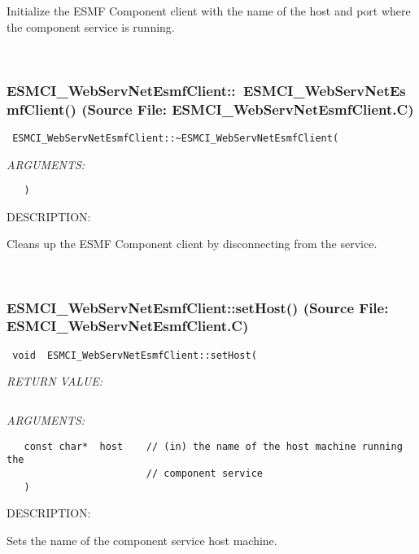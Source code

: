       Initialize the ESMF Component client with the name of the host and port
      where the component service is running.
   
 
\mbox{}\hrulefill\
 
\subsubsection{ESMCI\_WebServNetEsmfClient::~ESMCI\_WebServNetEsmfClient() (Source File: ESMCI\_WebServNetEsmfClient.C)}


  
\begin{verbatim} ESMCI_WebServNetEsmfClient::~ESMCI_WebServNetEsmfClient(\end{verbatim}{\em ARGUMENTS:}
\begin{verbatim}   )\end{verbatim}
{\sf DESCRIPTION:\\ }


      Cleans up the ESMF Component client by disconnecting from the service.
   
 
\mbox{}\hrulefill\
 
\subsubsection{ESMCI\_WebServNetEsmfClient::setHost() (Source File: ESMCI\_WebServNetEsmfClient.C)}


  
\begin{verbatim} void  ESMCI_WebServNetEsmfClient::setHost(\end{verbatim}{\em RETURN VALUE:}
\begin{verbatim} \end{verbatim}{\em ARGUMENTS:}
\begin{verbatim}   const char*  host    // (in) the name of the host machine running the
                        // component service
   )\end{verbatim}
{\sf DESCRIPTION:\\ }


      Sets the name of the component service host machine.
   
 
